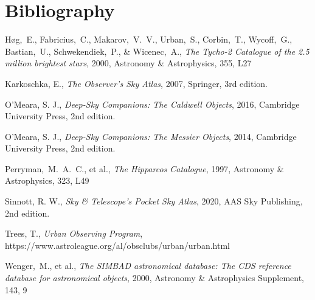 \chapter*{Bibliography}

Høg,~E., Fabricius,~C., Makarov,~V.~V., Urban,~S., Corbin,~T., Wycoff,~G., Bastian,~U., Schwekendiek,~P., \& Wicenec,~A., \emph{The Tycho-2 Catalogue of the 2.5 million brightest stars}, 2000, Astronomy \& Astrophysics, 355, L27

Karkoschka, E., \emph{The Observer’s Sky Atlas},  2007, Springer, 3rd edition.

O’Meara, S. J., \emph{Deep-Sky Companions: The Caldwell Objects},  2016, Cambridge University Press, 2nd edition.

O’Meara, S. J., \emph{Deep-Sky Companions: The Messier Objects},  2014, Cambridge University Press, 2nd edition.

Perryman,~M.~A.~C., et al., \emph{The Hipparcos Catalogue}, 1997,  Astronomy \& Astrophysics, 323, L49

Sinnott, R. W., \emph{Sky \& Telescope’s Pocket Sky Atlas}, 2020, AAS Sky Publishing, 2nd edition.

Trees, T., \emph{Urban Observing Program}, \\
https://www.astroleague.org/al/obsclubs/urban/urban.html

Wenger,~M., et al., \emph{The SIMBAD astronomical database: The CDS reference database for astronomical objects}, 2000, Astronomy \& Astrophysics Supplement, 143, 9

